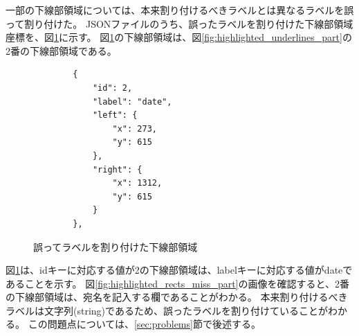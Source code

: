 一部の下線部領域については、本来割り付けるべきラベルとは異なるラベルを誤って割り付けた。
JSONファイルのうち、誤ったラベルを割り付けた下線部領域座標を、図\ref{fig:underlines_data_miss_json}に示す。
図\ref{fig:underlines_data_miss_json}の下線部領域は、図\ref{fig:highlighted_underlines_part}の2番の下線部領域である。

\lstset{language=}
\begin{figure}[t]
    \begin{lstlisting}
        {
            "id": 2,
            "label": "date",
            "left": {
                "x": 273,
                "y": 615
            },
            "right": {
                "x": 1312,
                "y": 615
            }
        },
    \end{lstlisting}
    \caption{誤ってラベルを割り付けた下線部領域}\label{fig:underlines_data_miss_json}
\end{figure}

図\ref{fig:underlines_data_miss_json}は、idキーに対応する値が2の下線部領域は、labelキーに対応する値がdateであることを示す。
図\ref{fig:highlighted_rects_miss_part}の画像を確認すると、2番の下線部領域は、宛名を記入する欄であることがわかる。
本来割り付けるべきラベルは文字列(string)であるため、誤ったラベルを割り付けていることがわかる。
この問題点については、\ref{sec:problems}節で後述する。